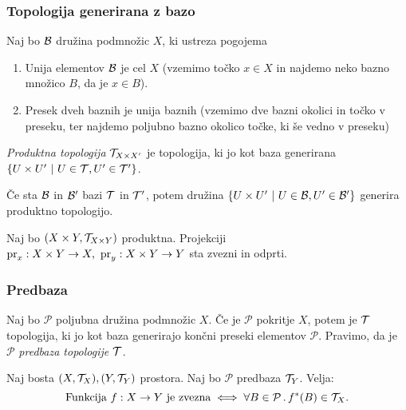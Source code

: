 \subsubsection{Topologija generirana z bazo}

\begin{trditev}
    Naj bo $\mathcal{B}$ družina podmnožic $X$, ki ustreza pogojema
    \begin{enumerate}
        \item Unija elementov $\mathcal{B}$ je cel $X$ (vzemimo točko $x \in X$ in najdemo neko bazno množico $B$, da je $x \in B$).
        \item Presek dveh baznih je unija baznih (vzemimo dve bazni okolici in točko v preseku, ter najdemo poljubno bazno okolico točke, ki še vedno v preseku)
    \end{enumerate} 
\end{trditev}
    
\begin{definicija}
    \emph{Produktna topologija} $\mathcal{T}_{X \times X'}$ je topologija, ki jo kot baza generirana $\left\{U \times U' \ | \ U \in \mathcal{T}, U' \in \mathcal{T}'\right\}$.
\end{definicija}

\begin{opomba}
    Če sta $\mathcal{B}$ in $\mathcal{B}'$ bazi $\mathcal{T}$ in $\mathcal{T}'$, potem družina $\left\{U \times U' \ | \ U \in \mathcal{B}, U' \in \mathcal{B}'\right\}$ generira produktno topologijo.
\end{opomba}

\begin{trditev}
    Naj bo $(X \times Y, \mathcal{T}_{X \times Y})$ produktna. Projekciji $\operatorname{pr}_x: X \times Y \to X, \ \operatorname{pr}_y: X \times Y \to Y$ sta zvezni in odprti.
\end{trditev}

\subsubsection{Predbaza}

\begin{trditev}
    Naj bo $\mathcal{P}$ poljubna družina podmnožic $X$. Če je $\mathcal{P}$ pokritje $X$, potem je $\mathcal{T}$ topologija, ki jo kot baza generirajo končni preseki elementov $\mathcal{P}$.
    Pravimo, da je $\mathcal{P}$ \emph{predbaza topologije $\mathcal{T}$}.
\end{trditev}

\begin{trditev}
    Naj bosta $(X, \mathcal{T}_X), (Y, \mathcal{T}_Y)$ prostora. Naj bo $\mathcal{P}$ predbaza $\mathcal{T}_Y$. Velja:
    $$\text{Funkcija } f: X \to Y \text{ je zvezna} \iff \forall B \in \mathcal{P} \,.\, f^{*}(B) \in \mathcal{T}_X.$$
\end{trditev}

